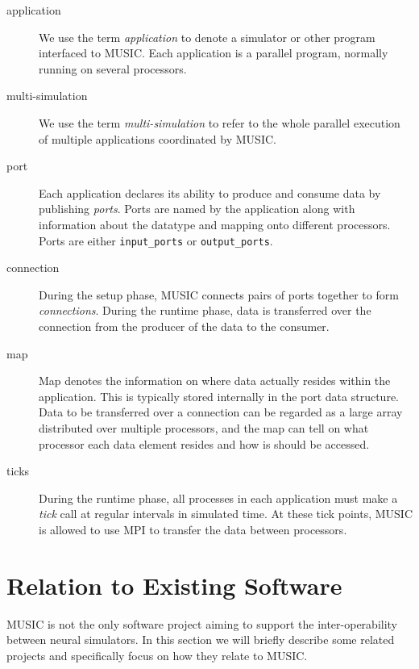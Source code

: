 \documentclass[a4paper]{report}
\begin{document}
\begin{description}
\item[application] We use the term
  \emph{application} to denote a simulator or other
  program interfaced to MUSIC.  Each application is a parallel
  program, normally running on several processors.

\item[multi-simulation] We use the term
  \emph{multi-simulation} to refer to the
  whole parallel execution of multiple applications coordinated by
  MUSIC.

\item[port] Each application declares its ability to produce and
  consume data by publishing \emph{ports}.  Ports are
  named by the application along with information about the datatype
  and mapping onto different processors.  Ports are either
  \lstinline|input_ports| or
  \lstinline|output_ports|.

\item[connection] During the setup phase, MUSIC connects pairs of
  ports together to form \emph{connections}.  During
  the runtime phase, data is transferred over the connection from the
  producer of the data to the consumer.

\item[map] Map denotes the information on where data
  actually resides within the application.  This is typically stored
  internally in the port data structure.  Data to be transferred over
  a connection can be regarded as a large array distributed over
  multiple processors, and the map can tell on what processor each
  data element resides and how is should be accessed.

\item[ticks] During the runtime phase, all processes in each
  application must make a \emph{tick} call at regular
  intervals in simulated time.  At these tick points, MUSIC is allowed
  to use MPI to transfer the data between processors.
\end{description}


\section{Relation to Existing Software}

MUSIC is not the only software project aiming to support the
inter-operability between neural simulators.  In this section we will
briefly describe some related projects and specifically focus on how
they relate to MUSIC.
\end{document}
